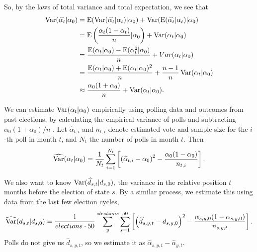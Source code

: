 \documentclass[thesis.tex]{subfiles}
\begin{document}
So, by the laws of total variance and total expectation, we see that \begin{equation}\begin{aligned}
	\operatorname{Var}(\widehat{\alpha_t} | \alpha_0)
	&= \operatorname{E}(\operatorname{Var}(\widehat{\alpha_t} | \alpha_t) | \alpha_0) + \operatorname{Var}(\operatorname{E}(\widehat{\alpha_t} | \alpha_t) | \alpha_0) \\
	&= \operatorname{E}\left(\frac{\alpha_t(1- \alpha_t)}{n} | \alpha_0\right) + \operatorname{Var}(\alpha_t | \alpha_0) \\
	&= \frac{\operatorname{E}(\alpha_t | \alpha_0) - \operatorname{E}(\alpha_t^2 | \alpha_0)}{n} + Var(\alpha_t | \alpha_0) \\
	&= \frac{\operatorname{E}(\alpha_t | \alpha_0) + \operatorname{E}(\alpha_t | \alpha_0)^2}{n} + \frac{n-1}{n}\operatorname{Var}(\alpha_t | \alpha_0) \\
	&\approx \frac{\alpha_0 (1 + \alpha_0)}{n} + \operatorname{Var}(\alpha_t | \alpha_0).
\end{aligned}
\end{equation}

We can estimate \(\operatorname{Var}(\alpha_t | \alpha_0)\) empirically using polling data and outcomes from past elections, by calculating the empirical variance of polls and subtracting \(\alpha_0 (1 + \alpha_0) / n\) . Let \(\widehat{\alpha}_{t, i}\) and \(n_{t, i}\) denote estimated vote and sample size for the \(i\)-th poll in month \(t\), and \(N_t\) the number of polls in month \(t\). Then \begin{equation}
\begin{aligned}
\widehat{\operatorname{Var}}(\alpha_t | \alpha_0) = \frac{1}{N_t} \sum_{i=1}^{N_t}\left[ \left( \widehat{\alpha}_{t, i} - \alpha_0\right)^2 - \frac{\alpha_0 (1 - \alpha_0)}{n_{t,i}} \right].
\end{aligned}
\end{equation}

We also want to know \(\operatorname{Var}(\widehat{d}_{s, t} | d_{s, 0}),\) the variance in the relative position \(t\) months before the election of state \(s\). By a similar process, we estimate this using data from the last few election cycles, \begin{equation}\begin{aligned}
	\widehat{\operatorname{Var}}(d_{s, t} | d_{s, 0}) = \frac{1}{elections \cdot 50} \sum_{y}^{elections} \sum_{s=1}^{50} \left[ \left( \widehat{d}_{s, y, t} - d_{s, y, 0}\right)^2 - \frac{\alpha_{s, y, 0} (1 - \alpha_{s, y, 0})}{n_{s, y, t}} \right].
\end{aligned}\end{equation} Polls do not give us \(\widehat{d}_{s, y, t}\), so we  estimate it as \(\widehat{\alpha}_{s, y, t} - \widehat{\alpha}_{y, t}\). 
\end{document}
